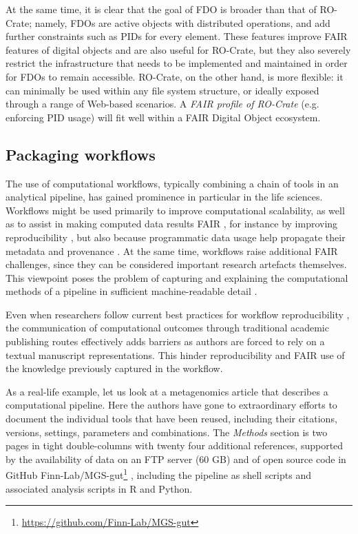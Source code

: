\documentclass[ds,v1.1.2,openaccess]{iosart2x}%
\begin{document}
At the same time, it is clear that the goal of FDO is broader than that
of RO-Crate; namely, FDOs are active objects with distributed
operations, and add further constraints such as PIDs for every element.
These features improve FAIR features of digital objects and are also
useful for RO-Crate, but they also severely restrict the infrastructure
that needs to be implemented and maintained in order for FDOs to remain
accessible. RO-Crate, on the other hand, is more flexible: it can
minimally be used within any file system structure, or ideally exposed
through a range of Web-based scenarios. A \textit{FAIR profile of RO-Crate}
(e.g. enforcing PID usage) will fit well within a FAIR Digital Object ecosystem.

 \subsection{Packaging workflows}

The use of computational workflows, typically combining a chain of
tools in an analytical pipeline, has gained prominence in particular in
the life sciences. Workflows might be used primarily to improve
computational scalability, as well as to assist in making computed
data results FAIR \cite{doi:10.1162/dint_a_00033}, for instance by
improving reproducibility \cite{doi:10.1016/j.future.2017.01.012}, but also
because programmatic data usage help propagate their metadata and
provenance \cite{doi:10.1002/cpe.1228}. At the same time, workflows raise
additional FAIR challenges, since they can be considered important
research artefacts themselves. This viewpoint poses the problem of
capturing and explaining the computational methods of a pipeline in
sufficient machine-readable detail \cite{doi:10.3233/DS-190026}.

Even when researchers follow current best practices for workflow
reproducibility \cite{doi:10.1016/j.cels.2018.03.014,doi:10.1016/j.future.2017.01.012}, the communication of computational
outcomes through traditional academic publishing routes effectively
adds barriers as authors are forced to rely on a textual manuscript
representations. This hinder reproducibility and FAIR use of the
knowledge previously captured in the workflow.

As a real-life example, let us look at a metagenomics article
\cite{doi:10.1038/s41586-019-0965-1} that describes a computational
pipeline. Here the authors have gone to extraordinary efforts to
document the individual tools that have been reused, including their
citations, versions, settings, parameters and combinations. The
\textit{Methods} section is two pages in tight double-columns with twenty four
additional references, supported by the availability of data on an FTP
server (60 GB) \cite{ebi_ftp_umgs2019} and of open source code in GitHub
Finn-Lab/MGS-gut\footnote{\url{https://github.com/Finn-Lab/MGS-gut}}
\cite{finn-lab-mgsgut}, including the pipeline as shell scripts and
associated analysis scripts in R and Python.
\end{document}
